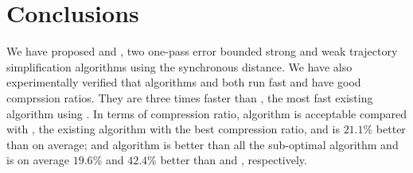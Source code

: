 \vspace{-1ex}
\section{Conclusions}  %
\label{sec-conclusion}

We have proposed \cist and \cista, two one-pass error bounded strong and weak trajectory simplification algorithms using the synchronous distance.
We have also experimentally verified that algorithms \cist and \cista both run fast and have good comprssion ratios.
They are three times faster than \squishe, the most fast existing \lsa algorithm using \sed.
%
In terms of compression ratio,
algorithm \cist is {acceptable} compared with \dps, the existing \lsa algorithm with the best compression ratio, and is $21.1\%$ better than \squishe on average; and
algorithm \cista is better than all the sub-optimal algorithm and is on average $19.6\%$ and $42.4\%$ better than \dps and \squishe, respectively.

